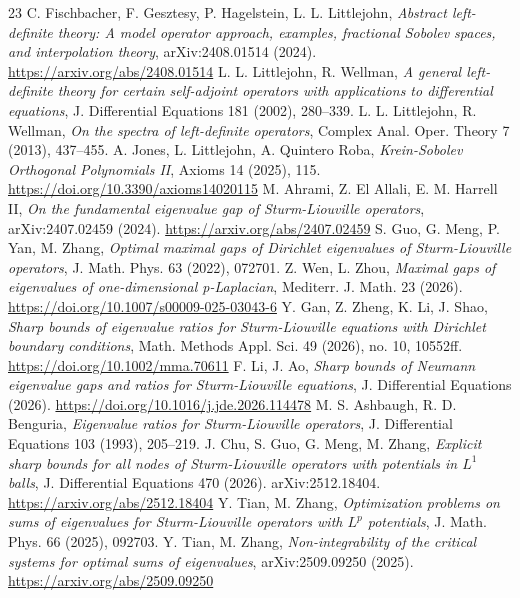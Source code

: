 \documentclass[UTF8]{ctexart}
\begin{document}
\begin{thebibliography}{23}
 C. Fischbacher, F. Gesztesy, P. Hagelstein, L. L. Littlejohn,
	\emph{Abstract left-definite theory: A model operator approach, examples,
fractional Sobolev spaces, and interpolation theory}, arXiv:2408.01514 (2024). \url{https://arxiv.org/abs/2408.01514}
 L. L. Littlejohn, R. Wellman, \emph{A general left-definite theory
	for certain self-adjoint operators with applications to differential equations},
	J. Differential Equations 181 (2002), 280--339.
 L. L. Littlejohn, R. Wellman, \emph{On the spectra of left-definite
	operators}, Complex Anal. Oper. Theory 7 (2013), 437--455.
 A. Jones, L. Littlejohn, A. Quintero Roba, \emph{Krein-Sobolev
	Orthogonal Polynomials II}, Axioms 14 (2025), 115. \url{https://doi.org/10.3390/axioms14020115}
 M. Ahrami, Z. El Allali, E. M. Harrell II, \emph{On the fundamental
eigenvalue gap of Sturm-Liouville operators}, arXiv:2407.02459 (2024). \url{https://arxiv.org/abs/2407.02459}
 S. Guo, G. Meng, P. Yan, M. Zhang, \emph{Optimal maximal gaps of
	Dirichlet eigenvalues of Sturm-Liouville operators}, J. Math. Phys. 63 (2022),
	072701.
 Z. Wen, L. Zhou, \emph{Maximal gaps of eigenvalues of one-dimensional
	p-Laplacian}, Mediterr. J. Math. 23 (2026). \url{https://doi.org/10.1007/s00009-025-03043-6}
 Y. Gan, Z. Zheng, K. Li, J. Shao, \emph{Sharp bounds of eigenvalue
	ratios for Sturm-Liouville equations with Dirichlet boundary conditions},
	Math. Methods Appl. Sci. 49 (2026), no. 10, 10552ff.
	\url{https://doi.org/10.1002/mma.70611}
 F. Li, J. Ao, \emph{Sharp bounds of Neumann eigenvalue gaps and
	ratios for Sturm-Liouville equations}, J. Differential Equations (2026).
	\url{https://doi.org/10.1016/j.jde.2026.114478}
 M. S. Ashbaugh, R. D. Benguria, \emph{Eigenvalue ratios for
	Sturm-Liouville operators}, J. Differential Equations 103 (1993), 205--219.
 J. Chu, S. Guo, G. Meng, M. Zhang, \emph{Explicit sharp bounds for
	all nodes of Sturm-Liouville operators with potentials in $L^1$ balls},
	J. Differential Equations 470 (2026). arXiv:2512.18404. \url{https://arxiv.org/abs/2512.18404}
 Y. Tian, M. Zhang, \emph{Optimization problems on sums of eigenvalues
	for Sturm-Liouville operators with $L^p$ potentials}, J. Math. Phys. 66 (2025),
	092703.
 Y. Tian, M. Zhang, \emph{Non-integrability of the critical systems
	for optimal sums of eigenvalues}, arXiv:2509.09250 (2025). \url{https://arxiv.org/abs/2509.09250}

\end{thebibliography}
\end{document}
